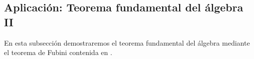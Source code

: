 
\subsection{Aplicación: Teorema fundamental del álgebra II}
En esta subsección demostraremos el teorema fundamental del álgebra mediante el teorema de Fubini contenida en \cite{conrad:fundthmalg-calculus}.

